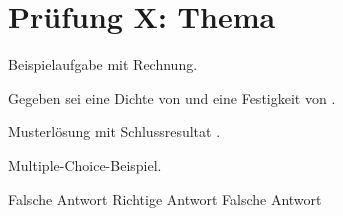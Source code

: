 %
%


\newcommand{\blattname}{Prüfung X: Thema}



\section*{\blattname}

\begin{questions}

\question[5] Beispielaufgabe mit Rechnung.

    Gegeben sei eine Dichte von  und eine Festigkeit von .

    \begin{solution}
        Musterlösung mit Schlussresultat .
    \end{solution}


\question[2] Multiple-Choice-Beispiel.
    \begin{checkboxes}
        \choice Falsche Antwort
        \CorrectChoice Richtige Antwort
        \choice Falsche Antwort
    \end{checkboxes}

\end{questions}


